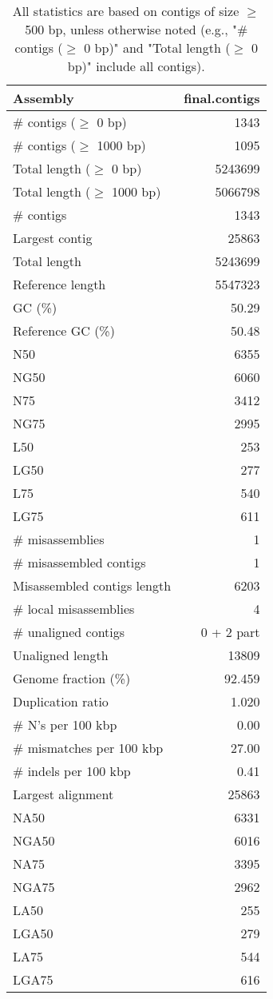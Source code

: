 \documentclass[12pt,a4paper]{article}
\begin{document}
\begin{table}[ht]
\begin{center}
\caption{All statistics are based on contigs of size $\geq$ 500 bp, unless otherwise noted (e.g., "\# contigs ($\geq$ 0 bp)" and "Total length ($\geq$ 0 bp)" include all contigs).}
\begin{tabular}{|l*{1}{|r}|}
\hline
Assembly & final.contigs \\ \hline
\# contigs ($\geq$ 0 bp) & 1343 \\ \hline
\# contigs ($\geq$ 1000 bp) & 1095 \\ \hline
Total length ($\geq$ 0 bp) & 5243699 \\ \hline
Total length ($\geq$ 1000 bp) & 5066798 \\ \hline
\# contigs & 1343 \\ \hline
Largest contig & 25863 \\ \hline
Total length & 5243699 \\ \hline
Reference length & 5547323 \\ \hline
GC (\%) & 50.29 \\ \hline
Reference GC (\%) & 50.48 \\ \hline
N50 & 6355 \\ \hline
NG50 & 6060 \\ \hline
N75 & 3412 \\ \hline
NG75 & 2995 \\ \hline
L50 & 253 \\ \hline
LG50 & 277 \\ \hline
L75 & 540 \\ \hline
LG75 & 611 \\ \hline
\# misassemblies & 1 \\ \hline
\# misassembled contigs & 1 \\ \hline
Misassembled contigs length & 6203 \\ \hline
\# local misassemblies & 4 \\ \hline
\# unaligned contigs & 0 + 2 part \\ \hline
Unaligned length & 13809 \\ \hline
Genome fraction (\%) & 92.459 \\ \hline
Duplication ratio & 1.020 \\ \hline
\# N's per 100 kbp & 0.00 \\ \hline
\# mismatches per 100 kbp & 27.00 \\ \hline
\# indels per 100 kbp & 0.41 \\ \hline
Largest alignment & 25863 \\ \hline
NA50 & 6331 \\ \hline
NGA50 & 6016 \\ \hline
NA75 & 3395 \\ \hline
NGA75 & 2962 \\ \hline
LA50 & 255 \\ \hline
LGA50 & 279 \\ \hline
LA75 & 544 \\ \hline
LGA75 & 616 \\ \hline
\end{tabular}
\end{center}
\end{table}
\end{document}
